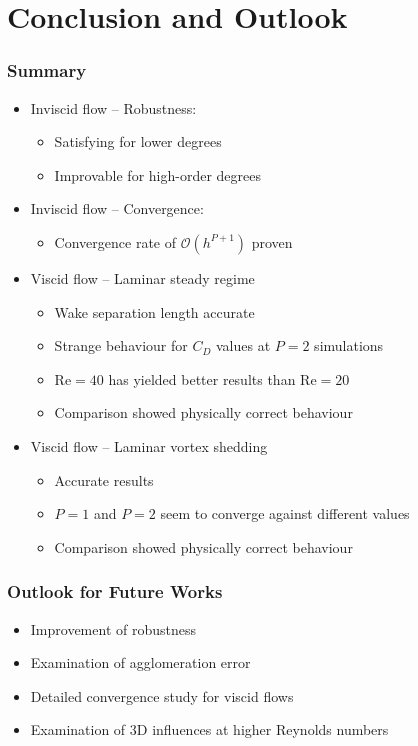 \section{Conclusion and Outlook}
\frame{\tableofcontents[currentsection]}
		\begin{frame}
			\frametitle{Summary}
			\begin{itemize}
				\item Inviscid flow -- Robustness:
				\begin{itemize}
					\item Satisfying for lower degrees
					\item Improvable for high-order degrees 
				\end{itemize}
				\item Inviscid flow -- Convergence:
				\begin{itemize}
					\item Convergence rate of $\mathcal{O}(h^{P+1})$ proven
				\end{itemize}
				\item Viscid flow -- Laminar steady regime
				\begin{itemize}
					\item Wake separation length accurate
					\item Strange behaviour for $C_D$ values at $P=2$ simulations
					\item $\text{Re}=40$ has yielded better results than $\text{Re}=20$
					\item Comparison showed physically correct behaviour
				\end{itemize}
				\item Viscid flow -- Laminar vortex shedding
				\begin{itemize}
					\item Accurate results
					\item $P=1$ and $P=2$ seem to converge against different values
					\item Comparison showed physically correct behaviour
				\end{itemize}
			\end{itemize}
		\end{frame}
		\begin{frame}
			\frametitle{Outlook for Future Works}
		
				\begin{itemize}
					\item Improvement of robustness
					\item Examination of agglomeration error
					\item Detailed convergence study for viscid flows
					\item Examination of 3D influences at higher Reynolds numbers
				\end{itemize}
		\end{frame}
		
